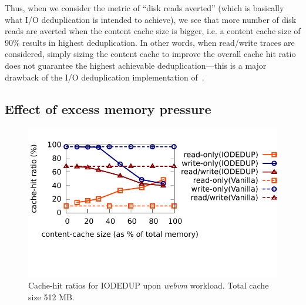 Thus, when we consider the metric of ``disk reads averted'' (which is
basically what I/O deduplication is intended to achieve), we see that
more number of disk reads are averted when the content cache size is
bigger, i.e. a content cache size of 90\% results in highest deduplication.
In other words, when read/write traces are considered, simply sizing the
content cache to improve the overall cache hit ratio does not guarantee the
highest achievable deduplication---this is a major drawback of the
I/O deduplication implementation of~\cite{iodedup}.


\subsection{Effect of excess memory pressure}
\begin{figure}
    \centering
    \includegraphics[scale=0.80]{confided-figures/sweetspot-512MB/sweetspot-512MB.pdf}
\vspace{-0.5in}
\caption{Cache-hit ratios for IODEDUP upon \textit{webvm} workload. 
Total cache size 512 MB.}
\vspace{-0.05in}
\label{fig:sweetspot-512MB}
\end{figure}


